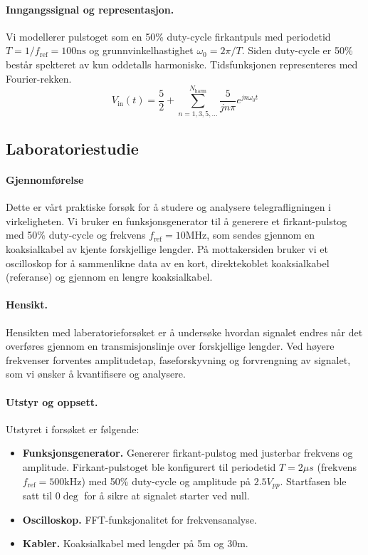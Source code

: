 \paragraph{Inngangssignal og representasjon.}
Vi modellerer pulstoget som en 50\% duty-cycle firkantpuls med periodetid $T=1/f_\mathrm{ref} = 100 \mathrm{ns}$ og grunnvinkelhastighet $\omega_0 = 2\pi / T$. Siden duty-cycle er 50\% består spekteret av kun oddetalls harmoniske. Tidsfunksjonen representeres med Fourier-rekken.
\begin{equation}
    V_{\mathrm{in}}(t) = \frac{5}{2} + \sum_{n=1,3,5,...}^{N_{\mathrm{harm}}}\frac{5}{jn\pi} e^{jn\omega_0 t}
\end{equation} 



\subsection{Laboratoriestudie}
\paragraph{Gjennomførelse}
Dette er vårt praktiske forsøk for å studere og analysere telegrafligningen i virkeligheten. Vi bruker en funksjonsgenerator til å generere et firkant-pulstog med 50\% duty-cycle og frekvens $f_\mathrm{ref} = 10 \mathrm{MHz}$, som sendes gjennom en koaksialkabel av kjente forskjellige lengder. På mottakersiden bruker vi et oscilloskop for å sammenlikne data av en kort, direktekoblet koaksialkabel (referanse) og gjennom en lengre koaksialkabel.

\paragraph{Hensikt.} Hensikten med laberatorieforsøket er å undersøke hvordan signalet endres når det overføres gjennom en transmisjonslinje over forskjellige lengder. Ved høyere frekvenser forventes amplitudetap, faseforskyvning og forvrengning av signalet, som vi ønsker å kvantifisere og analysere.

\paragraph{Utstyr og oppsett.}
Utstyret i forsøket er følgende:
\begin{itemize}
    \item \textbf{Funksjonsgenerator.} Genererer firkant-pulstog med justerbar frekvens og amplitude. Firkant-pulstoget ble konfigurert til periodetid $T = 2 \mu s$ (frekvens $f_\mathrm{ref} = 500 \mathrm{kHz}$) med 50\% duty-cycle og amplitude på $2.5V_{pp}$. Startfasen ble satt til $0\deg$ for å sikre at signalet starter ved null.
    \item \textbf{Oscilloskop.} FFT-funksjonalitet for frekvensanalyse.
    \item \textbf{Kabler.} Koaksialkabel med lengder på 5m og 30m.
\end{itemize}

